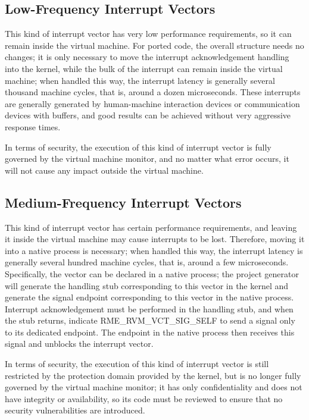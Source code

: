 \subsection{Low-Frequency Interrupt Vectors}\label{subsec:6-3-1}

This kind of interrupt vector has very low performance requirements, so it can remain inside the virtual machine. For ported code, the overall structure needs no changes; it is only necessary to move the interrupt acknowledgement handling into the kernel, while the bulk of the interrupt can remain inside the virtual machine; when handled this way, the interrupt latency is generally several thousand machine cycles, that is, around a dozen microseconds. These interrupts are generally generated by human-machine interaction devices or communication devices with buffers, and good results can be achieved without very aggressive response times.

In terms of security, the execution of this kind of interrupt vector is fully governed by the virtual machine monitor, and no matter what error occurs, it will not cause any impact outside the virtual machine.

\subsection{Medium-Frequency Interrupt Vectors}\label{subsec:6-3-2}

This kind of interrupt vector has certain performance requirements, and leaving it inside the virtual machine may cause interrupts to be lost. Therefore, moving it into a native process is necessary; when handled this way, the interrupt latency is generally several hundred machine cycles, that is, around a few microseconds. Specifically, the vector can be declared in a native process; the project generator will generate the handling stub corresponding to this vector in the kernel and generate the signal endpoint corresponding to this vector in the native process. Interrupt acknowledgement must be performed in the handling stub, and when the stub returns, indicate RME\_RVM\_VCT\_SIG\_SELF to send a signal only to its dedicated endpoint. The endpoint in the native process then receives this signal and unblocks the interrupt vector.

In terms of security, the execution of this kind of interrupt vector is still restricted by the protection domain provided by the kernel, but is no longer fully governed by the virtual machine monitor; it has only confidentiality and does not have integrity or availability, so its code must be reviewed to ensure that no security vulnerabilities are introduced.

